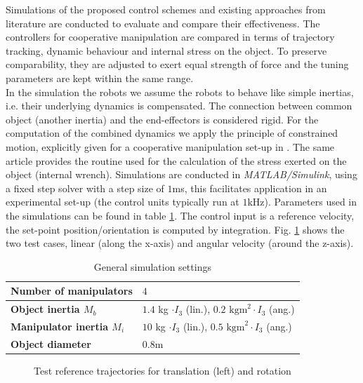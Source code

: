 \documentclass[a4paper,twoside, openright,12pt]{report}
\begin{document}
Simulations of the proposed control schemes and existing approaches from literature are conducted to evaluate and compare their effectiveness. The controllers for cooperative manipulation are compared in terms of trajectory tracking, dynamic behaviour and internal stress on the object. To preserve comparability, they are adjusted to exert equal strength of force and the tuning parameters are kept within the same range.\\
In the simulation the robots we assume the robots to behave like simple inertias, i.e. their underlying dynamics is compensated. The connection between common object (another inertia) and the end-effectors is considered rigid. For the computation of the combined dynamics we apply the principle of constrained motion, explicitly given for a cooperative manipulation set-up in \cite{Erhart_16}. The same article provides the routine used for the calculation of the stress exerted on the object (internal wrench).
Simulations are conducted in \emph{MATLAB/Simulink}, using a fixed step solver with a step size of $1$ms, this facilitates application in an experimental set-up (the control units typically run at $1$kHz). Parameters used in the simulations can be found in table \ref{TAB:generalsimulationprop}. The control input is a  reference velocity, the set-point position/orientation is computed by integration. Fig. \ref{FIG:ReferenceTrajectory} shows the two test cases, linear (along the x-axis) and angular velocity (around the z-axis). 
\begin{table}[h]
	\centering
	\caption[General simulation settings]{General simulation settings}\vspace{10pt}
	\label{TAB:generalsimulationprop}
	
	\begin{tabular}{ l | l}
		\textbf{Number of manipulators} & \textbf{$4$}\\ \hline
		\textbf{Object inertia $M_b$} & $1.4$ kg $\cdot I_3$ (lin.), $0.2 \text{ kgm}^2 \cdot I_3$ (ang.)\\ \hline
		\textbf{Manipulator inertia $M_i$} & $10$ kg $\cdot I_3$ (lin.), $0.5 \text{ kgm}^2 \cdot I_3$ (ang.) \\ \hline
		\textbf{Object diameter} & $0.8$m \\ \hline
	\end{tabular}
\end{table}
\begin{figure}[h]
\centering

\caption{Test reference trajectories for translation (left) and rotation}
\label{FIG:ReferenceTrajectory}
\end{figure}
\end{document}
